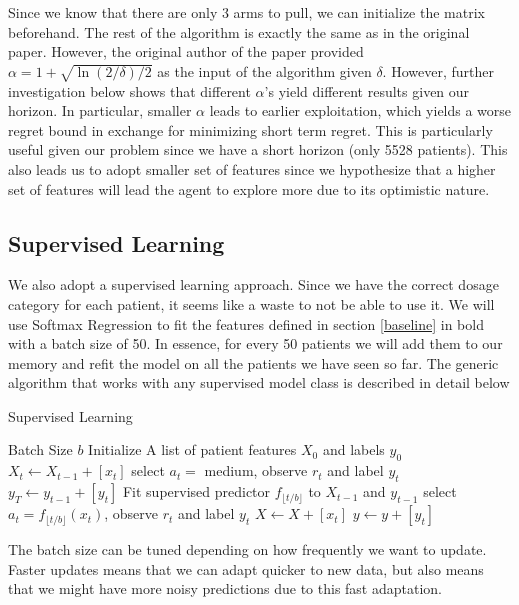 \documentclass{article}
\begin{document}
Since we know that there are only 3 arms to pull, we can initialize the matrix beforehand. The rest of the algorithm is exactly the same as in the original paper. However, the original author of the paper provided $\alpha = 1 + \sqrt{\ln(2/\delta)/2}$ as the input of the algorithm given $\delta$. However, further investigation below shows that different $\alpha$'s yield different results given our horizon. In particular, smaller $\alpha$ leads to earlier exploitation, which yields a worse regret bound in exchange for minimizing short term regret. This is particularly useful given our problem since we have a short horizon (only 5528 patients). This also leads us to adopt smaller set of features since we hypothesize that a higher set of features will lead the agent to explore more due to its optimistic nature.

\subsection{Supervised Learning}
\label{supervised_learning_approach}
We also adopt a supervised learning approach. Since we have the correct dosage category for each patient, it seems like a waste to not be able to use it. We will use Softmax Regression to fit the features defined in section \ref{baseline} in bold with a batch size of 50. In essence, for every 50 patients we will add them to our memory and refit the model on all the patients we have seen so far. The generic algorithm that works with any supervised model class is described in detail below
\begin{algorithm}[tbh]
	\caption{Supervised Learning}
	\label{alg:linucb}
	\begin{algorithmic}
		 Batch Size $b$
		\STATE Initialize A list of patient features $X_0$ and labels $y_0$
		\STATE $X_t \leftarrow X_{t-1} + [x_{t}]$
		\STATE select $a_t = $ medium, observe $r_t$ and label $y_t$
		\STATE $y_T \leftarrow y_{t-1} + [y_t]$
		\ENDIF
		\STATE Fit supervised predictor $f_{\lfloor t/b\rfloor}$ to $X_{t-1}$ and $y_{t-1}$
		\ENDIF
		\STATE select $a_t = f_{\lfloor t/b\rfloor}(x_t)$, observe $r_t$ and label $y_t$
		\STATE $X \leftarrow X + [x_{t}]$
		\STATE $y \leftarrow y + [y_t]$
		\ENDFOR
	\end{algorithmic}
\end{algorithm}

The batch size can be tuned depending on how frequently we want to update. Faster updates means that we can adapt quicker to new data, but also means that we might have more noisy predictions due to this fast adaptation.
\end{document}
